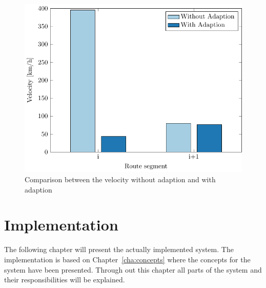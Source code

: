 \documentclass[master,english]{hgbthesis}
\begin{document}
\begin{figure}
\centering
\includegraphics[width=0.7\linewidth]{./images/1058adaptioncomp}
%
%
%
\caption{Comparison between the velocity without adaption and with adaption}
\label{fig:1058adaptioncomp}
\end{figure}%
\chapter{Implementation}
\label{cha:implementation}
The following chapter will present the actually implemented system. The implementation is based on Chapter~\ref{cha:concepts} where the concepts for the system have been presented. Through out this chapter all parts of the system and their responsibilities will be explained.
\end{document}
